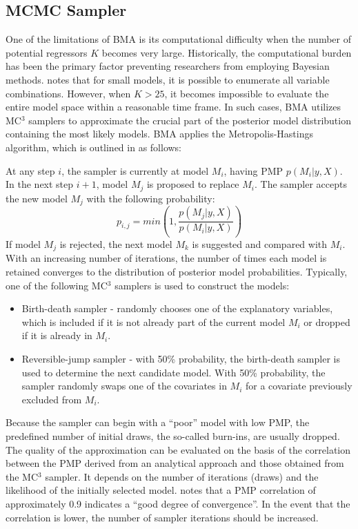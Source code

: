 \documentclass[a4paper,11pt]{article}
\begin{document}
\subsection*{MCMC Sampler}
\label{sec:mc3}
One of the limitations of \ac{BMA} is its computational difficulty when the number of potential regressors $K$ becomes very large. Historically, the computational burden has been the primary factor preventing researchers from employing Bayesian methods. \citet{Zeugner2011} notes that for small models, it is possible to enumerate all variable combinations. However, when $K > 25$, it becomes impossible to evaluate the entire model space within a reasonable time frame. In such cases, \ac{BMA} utilizes MC$^{3}$ samplers to approximate the crucial part of the posterior model distribution containing the most likely models. \ac{BMA} applies the Metropolis-Hastings algorithm, which is outlined in \citet{Zeugner2011} as follows:

At any step $i$, the sampler is currently at model $M_{i}$, having \ac{PMP} $p(M_{i} \vert y,X)$. In the next step $i+1$, model $M_{j}$ is proposed to replace $M_{i}$. The sampler accepts the new model $M_{j}$ with the following probability:
\begin{equation}\label{eq:sampler}
p_{i,j} = min \left( 1, \frac{p(M_{j} \vert y,X)}{p(M_{i} \vert y,X)}\right)
\end{equation}
If model $M_{j}$ is rejected, the next model $M_{k}$ is suggested and compared with $M_{i}$. With an increasing number of iterations, the number of times each model is retained converges to the distribution of posterior model probabilities. Typically, one of the following MC$^{3}$ samplers is used to construct the models:
%
\begin{itemize}
	\item{Birth-death sampler - randomly chooses one of the explanatory variables, which is included if it is not already part of the current model $M_{i}$ or dropped if it is already in $M_{i}$.}
	\item{Reversible-jump sampler - with 50\% probability, the birth-death sampler is used to determine the next candidate model. With 50\% probability, the sampler randomly swaps one of the covariates in $M_{i}$ for a covariate previously excluded from $M_{i}$.}
\end{itemize}
%
Because the sampler can begin with a ``poor'' model with low \ac{PMP}, the predefined number of initial draws, the so-called burn-ins, are usually dropped. The quality of the approximation can be evaluated on the basis of the correlation between the \ac{PMP} derived from an analytical approach and those obtained from the MC$^{3}$ sampler. It depends on the number of iterations (draws) and the likelihood of the initially selected model. \citet{Zeugner2011} notes that a \ac{PMP} correlation of approximately 0.9 indicates a ``good degree of convergence''. In the event that the correlation is lower, the number of sampler iterations should be increased.
\end{document}
